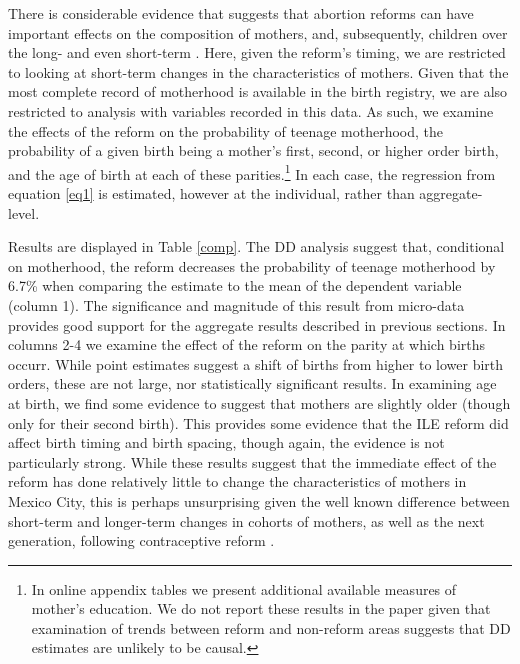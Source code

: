 \documentclass[a4paper, 11pt]{article}
\begin{document}
\begin{spacing}{2}
There is considerable evidence that suggests that abortion reforms can have important effects on the composition of mothers, and, subsequently, children over the long- \citep{Ananatetal2009,Pop-Eleches,Bailey2013} and even short-term \citep{Baileyetal2014}.  Here, given the reform's timing, we are restricted to looking at short-term changes in the characteristics of mothers.  Given that the most complete record of motherhood is available in the birth registry, we are also restricted to analysis with variables recorded in this data.  As such, we examine the effects of the reform on the probability of teenage motherhood, the probability of a given birth being a mother's first, second, or higher order birth, and the age of birth at each of these parities.\footnote{In online appendix tables we present additional available measures of mother's education.  We do not report these results in the paper given that examination of trends between reform and non-reform areas suggests that DD estimates are unlikely to be causal.}  In each case, the regression from equation \ref{eq1} is estimated, however at the individual, rather than aggregate-level.

Results are displayed in Table \ref{comp}. The DD analysis suggest that, conditional on motherhood, the reform decreases the probability of teenage motherhood by 6.7\% when comparing the estimate to the mean of the dependent variable (column 1). The significance and magnitude of this result from micro-data provides good support for the aggregate results described in previous sections.  In columns 2-4 we examine the effect of the reform on the parity at which births occurr.  While point estimates suggest a shift of births from higher to lower birth orders, these are not large, nor statistically significant results.  In examining age at birth, we find some evidence to suggest that mothers are slightly older (though only for their second birth).  This provides some evidence that the ILE reform did affect birth timing and birth spacing, though again, the evidence is not particularly strong.  While these results suggest that the immediate effect of the reform has done relatively little to change the characteristics of mothers in Mexico City, this is perhaps unsurprising given the well known difference between short-term and longer-term changes in cohorts of mothers, as well as the next generation, following contraceptive reform \citep{Ananatetal2009,Gruberetal1999}.


\end{spacing}
\end{document}
